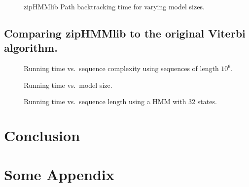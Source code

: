 \documentclass[oneside,a4,danish,english,report]{memoir}
\begin{document}
\begin{figure}[H]
  \centering
  
  \caption{zipHMMlib Path backtracking time for varying model sizes.}
  \label{fig:assymptotic_viterbi_backtrack_k}
\end{figure}

\section{Comparing zipHMMlib to the original Viterbi algorithm.}
\label{sec:comp-ziphmml-orig}

\begin{figure}[H]
  \centering
  
  \caption{Running time vs.\ sequence complexity using sequences of length $10^6$.}
  \label{fig:speedup_vs_complexity}
\end{figure}

\begin{figure}[H]
  \centering
  
  \caption{Running time vs.\ model size.}
  \label{fig:speedup_vs_k}
\end{figure}

\begin{figure}[H]
  \centering
  
  \caption{Running time vs.\ sequence length using a HMM with 32 states.}
  \label{fig:speedup_vs_sequence_length}
\end{figure}

\chapter{Conclusion}
\label{cha:conclusion}

\appendix{}

\chapter{Some Appendix}
\label{cha:some-appendix}

\backmatter{}


\end{document}

